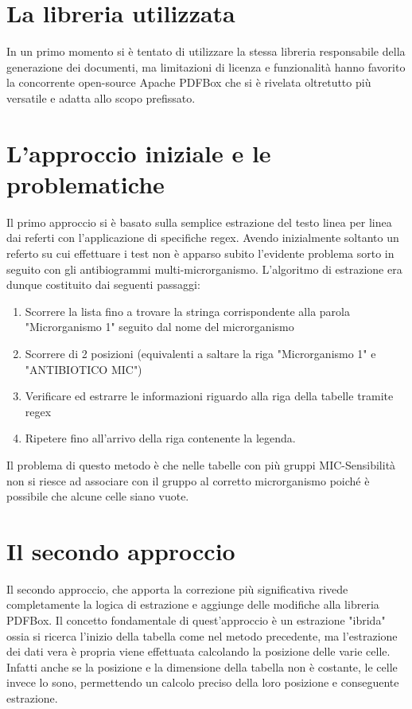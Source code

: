 \section{La libreria utilizzata}
In un primo momento si è tentato di utilizzare la stessa libreria responsabile della generazione dei documenti, ma limitazioni di licenza e funzionalità hanno favorito la concorrente open-source Apache PDFBox che si è rivelata oltretutto più versatile e adatta allo scopo prefissato.
\section{L'approccio iniziale e le problematiche}
Il primo approccio si è basato sulla semplice estrazione del testo linea per linea dai referti con l'applicazione di specifiche regex. 
Avendo inizialmente soltanto un referto su cui effettuare i test non è apparso subito l'evidente problema sorto in seguito con gli antibiogrammi multi-microrganismo.
L'algoritmo di estrazione era dunque costituito dai seguenti passaggi:
\begin{enumerate}
\item Scorrere la lista fino a trovare la stringa corrispondente alla parola "Microrganismo 1" seguito dal nome del microrganismo
\item Scorrere di 2 posizioni (equivalenti a saltare la riga "Microrganismo 1" e "ANTIBIOTICO MIC")
\item Verificare ed estrarre le informazioni riguardo alla riga della tabelle tramite regex
\item Ripetere fino all'arrivo della riga contenente la legenda.
\end{enumerate}
Il problema di questo metodo è che nelle tabelle con più gruppi MIC-Sensibilità non si riesce ad associare con il gruppo al corretto microrganismo poiché è possibile che alcune celle siano vuote.
\section{Il secondo approccio}
Il secondo approccio, che apporta la correzione più significativa rivede completamente la logica di estrazione e aggiunge delle modifiche alla libreria PDFBox.
Il concetto fondamentale di quest'approccio è un estrazione "ibrida" ossia si ricerca l'inizio della tabella come nel metodo precedente, ma l'estrazione dei dati vera è propria viene effettuata calcolando la posizione delle varie celle.
\newline
Infatti anche se la posizione e la dimensione della tabella non è costante, le celle invece lo sono, permettendo un calcolo preciso della loro posizione e conseguente estrazione.
